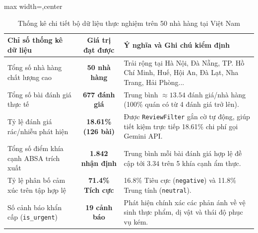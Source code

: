 \documentclass[12pt, a4paper]{article}
\begin{document}
\begin{table}[!htbp]
\centering
\caption{Thống kê chi tiết bộ dữ liệu thực nghiệm trên 50 nhà hàng tại Việt Nam}
\vspace{0.15cm}
\footnotesize
\begin{adjustbox}{max width=\textwidth,center}
\begin{tabularx}{0.97\textwidth}{l c X}
\toprule
\rowcolor{blue!8}
\textbf{Chỉ số thống kê dữ liệu} & \textbf{Giá trị đạt được} & \textbf{Ý nghĩa và Ghi chú kiểm định} \\
\midrule
Tổng số nhà hàng chất lượng cao & \textbf{50 nhà hàng} & Trải rộng tại Hà Nội, Đà Nẵng, TP. Hồ Chí Minh, Huế, Hội An, Đà Lạt, Nha Trang, Hải Phòng... \\
\addlinespace
Tổng số bài đánh giá thực tế & \textbf{677 đánh giá} & Trung bình $\approx 13.54$ đánh giá/nhà hàng (100\% quán có từ 4 đánh giá trở lên). \\
\addlinespace
Tỷ lệ đánh giá rác/nhiễu phát hiện & \textbf{18.61\% (126 bài)} & Được \texttt{ReviewFilter} gắn cờ tự động, giúp tiết kiệm trực tiếp 18.61\% chi phí gọi Gemini API. \\
\addlinespace
Tổng số điểm khía cạnh ABSA trích xuất & \textbf{1.842 nhận định} & Trung bình mỗi bài đánh giá hợp lệ đề cập tới $3.34$ trên 5 khía cạnh ẩm thực. \\
\addlinespace
Tỷ lệ phân bố cảm xúc trên tập hợp lệ & \textbf{71.4\% Tích cực} & 16.8\% Tiêu cực (\texttt{negative}) và 11.8\% Trung tính (\texttt{neutral}). \\
\addlinespace
Số cảnh báo khẩn cấp (\texttt{is\_urgent}) & \textbf{19 cảnh báo} & Phát hiện chính xác các phản ánh về vệ sinh thực phẩm, dị vật và thái độ phục vụ kém. \\
\bottomrule
\end{tabularx}
\end{adjustbox}
\end{table}
\end{document}
